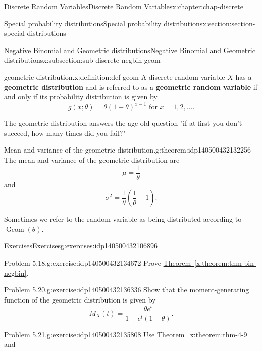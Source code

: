 \documentclass[oneside,10pt,]{book}
\newcommand{\xreffont}{\relax}
\newcommand{\terminology}[1]{\textbf{#1}}
\begin{document}
\begin{chapterptx}{Discrete Random Variables}{}{Discrete Random Variables}{}{}{x:chapter:chap-discrete}
\begin{sectionptx}{Special probability distributions}{}{Special probability distributions}{}{}{x:section:section-special-distributions}
\begin{subsectionptx}{Negative Binomial and Geometric distributions}{}{Negative Binomial and Geometric distributions}{}{}{x:subsection:sub-discrete-negbin-geom}
\begin{definition}{geometric distribution.}{x:definition:def-geom}%
A discrete random variable \(\displaystyle X\) has a \terminology{geometric distribution} and is referred to as a \terminology{geometric random variable} if and only if its probability distribution is given by%
\begin{equation*}
g(x; \theta) = \theta(1-\theta)^{x-1}
\text{ for }x = 1, 2, \dots\text{.}
\end{equation*}
%
\end{definition}
The geometric distribution answers the age-old question "if at first you don't succeed, how many times did you fail?"%
\begin{theorem}{Mean and variance of the geometric distribution.}{}{g:theorem:idp140500432132256}%
The mean and variance of the geometric distribution are%
\begin{equation*}
\mu =
\frac{1}{\theta}
\end{equation*}
and%
\begin{equation*}
\sigma^2 =
\frac{1}{\theta}\left(\frac{1}{\theta}-1\right)\text{.}
\end{equation*}
%
\end{theorem}
Sometimes we refer to the random variable as being distributed according to \(\operatorname{Geom}(\theta)\).%
\end{subsectionptx}
%
%
\typeout{************************************************}
\typeout{************************************************}
%
\begin{exercises-subsection}{Exercises}{}{Exercises}{}{}{g:exercises:idp140500432106896}
\begin{divisionexercise}{1}{Problem 5.18.}{}{g:exercise:idp140500432134672}%
Prove \hyperref[x:theorem:thm-bin-negbin]{Theorem~{\xreffont\ref{x:theorem:thm-bin-negbin}}}.%
\end{divisionexercise}%
\begin{divisionexercise}{2}{Problem 5.20.}{}{g:exercise:idp140500432136336}%
Show that the moment-generating function of the geometric distribution is given by%
\begin{equation*}
M_X(t) = \dfrac{\theta
e^t}{1-e^t(1-\theta)}\text{.}
\end{equation*}
%
\end{divisionexercise}%
\begin{divisionexercise}{3}{Problem 5.21.}{}{g:exercise:idp140500432135808}%
Use \hyperref[x:theorem:thm-4-9]{Theorem~{\xreffont\ref{x:theorem:thm-4-9}}} and%

\end{divisionexercise}
\end{exercises-subsection}
\end{sectionptx}
\end{chapterptx}
\end{document}
